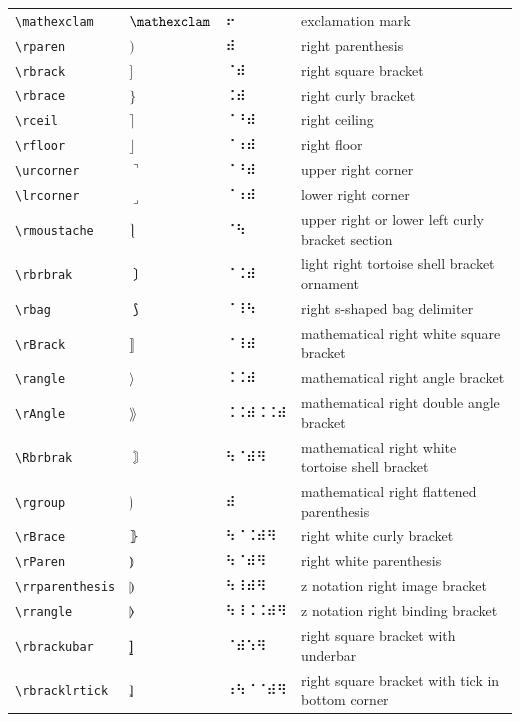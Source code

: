 \documentclass[oneside]{article}
\begin{document}
\begin{longtable}{llll}
\verb|\mathexclam| & $\mathexclam$ &  ⠖  & {exclamation mark} \\[2ex]
\verb|\rparen| & $\rparen$ &  ⠾  & {right parenthesis} \\[2ex]
\verb|\rbrack| & $\rbrack$ &  ⠈⠾  & {right square bracket} \\[2ex]
\verb|\rbrace| & $\rbrace$ &  ⠨⠾  & {right curly bracket} \\[2ex]
\verb|\rceil| & $\rceil$ &  ⠈⠘⠾  & {right ceiling} \\[2ex]
\verb|\rfloor| & $\rfloor$ &  ⠈⠰⠾  & {right floor} \\[2ex]
\verb|\urcorner| & $\urcorner$ &  ⠈⠘⠾  & {upper right corner} \\[2ex]
\verb|\lrcorner| & $\lrcorner$ &  ⠈⠰⠾  & {lower right corner} \\[2ex]
\verb|\rmoustache| & $\rmoustache$ &  ⠈⠳  & {upper right or lower left curly bracket section} \\[2ex]
\verb|\rbrbrak| & $\rbrbrak$ &  ⠈⠨⠾  & {light right tortoise shell bracket ornament} \\[2ex]
\verb|\rbag| & $\rbag$ &  ⠈⠸⠳  & {right s-shaped bag delimiter} \\[2ex]
\verb|\rBrack| & $\rBrack$ &  ⠈⠸⠾  & {mathematical right white square bracket} \\[2ex]
\verb|\rangle| & $\rangle$ &  ⠨⠨⠾  & {mathematical right angle bracket} \\[2ex]
\verb|\rAngle| & $\rAngle$ &  ⠨⠨⠾⠨⠨⠾  & {mathematical right double angle bracket} \\[2ex]
\verb|\Rbrbrak| & $\Rbrbrak$ &  ⠳⠈⠾⠻  & {mathematical right white tortoise shell bracket} \\[2ex]
\verb|\rgroup| & $\rgroup$ &  ⠾  & {mathematical right flattened parenthesis} \\[2ex]
\verb|\rBrace| & $\rBrace$ &  ⠳⠈⠨⠾⠻  & {right white curly bracket} \\[2ex]
\verb|\rParen| & $\rParen$ &  ⠳⠈⠾⠻  & {right white parenthesis} \\[2ex]
\verb|\rrparenthesis| & $\rrparenthesis$ &  ⠳⠸⠾⠻  & {z notation right image bracket} \\[2ex]
\verb|\rrangle| & $\rrangle$ &  ⠳⠸⠨⠨⠾⠻  & {z notation right binding bracket} \\[2ex]
\verb|\rbrackubar| & $\rbrackubar$ &  ⠈⠾⠱⠻  & {right square bracket with underbar} \\[2ex]
\verb|\rbracklrtick| & $\rbracklrtick$ &  ⠰⠳⠈⠈⠾⠻  & {right square bracket with tick in bottom corner} \\[2ex]

\end{longtable}
\end{document}
